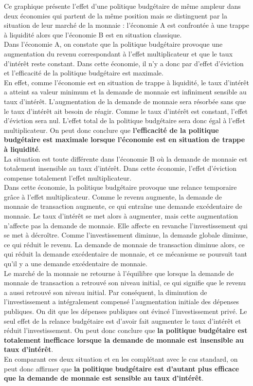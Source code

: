 \documentclass[10pt]{book}
\begin{document}
Ce graphique présente l'effet d'une politique budgétaire de même ampleur dans deux économies qui partent de la même position mais se distinguent par la situation de leur marché de la monnaie : l'économie A est confrontée à une trappe à liquidité alors que l'économie B est en situation classique. \\
Dans l'économie A, on constate que la politique budgétaire provoque une augmentation du revenu correspondant à l'effet multiplicateur et que le taux d'intérêt reste constant. Dans cette économie, il n'y a donc par d'effet d'éviction et l'efficacité de la politique budgétaire est maximale. \\
En effet, comme l'économie est en situation de trappe à liquidité, le taux d'intérêt a atteint sa valeur minimum et la demande de monnaie est infiniment sensible au taux d'intérêt. L'augmentation de la demande de monnaie sera résorbée sans que le taux d'intérêt ait besoin de réagir. Comme le taux d'intérêt est constant, l'effet d'éviction sera nul. L'effet total de la politique budgétaire sera donc égal à l'effet multiplicateur. On peut donc conclure que \textbf{l'efficacité de la politique budgétaire est maximale lorsque l'économie est en situation de trappe à liquidité}. \\
La situation est toute différente dans l'économie B où la demande de monnaie est totalement insensible au taux d'intérêt. Dans cette économie, l'effet d'éviction compense totalement l'effet multiplicateur. \\
Dans cette économie, la politique budgétaire provoque une relance temporaire grâce à l'effet multiplicateur. Comme le revenu augmente, la demande de monnaie de transaction augmente, ce qui entraîne une demande excédentaire de monnaie. Le taux d'intérêt se met alors à augmenter, mais cette augmentation n'affecte pas la demande de monnaie. Elle affecte en revanche l'investissement qui se met à décroître. Comme l'investissement diminue, la demande globale diminue, ce qui réduit le revenu. La demande de monnaie de transaction diminue alors, ce qui réduit la demande excédentaire de monnaie, et ce mécanisme se poursuit tant qu'il y a une demande excédentaire de monnaie. \\
Le marché de la monnaie ne retourne à l'équilibre que lorsque la demande de monnaie de transaction a retrouvé son niveau initial, ce qui signifie que le revenu a aussi retrouvé son niveau initial. Par conséquent, la diminution de l'investissement a intégralement compensé l'augmentation initiale des dépenses publiques. On dit que les dépenses publiques ont évincé l'investissement privé. Le seul effet de la relance budgétaire est d'avoir fait augmenter le taux d'intérêt et réduit l'investissement. On peut donc conclure que \textbf{la politique budgétaire est totalement inefficace lorsque la demande de monnaie est insensible au taux d'intérêt}. \\
En comparant ces deux situation et en les complétant avec le cas standard, on peut donc affirmer que \textbf{la politique budgétaire est d'autant plus efficace que la demande de monnaie est sensible au taux d'intérêt}.
\end{document}

